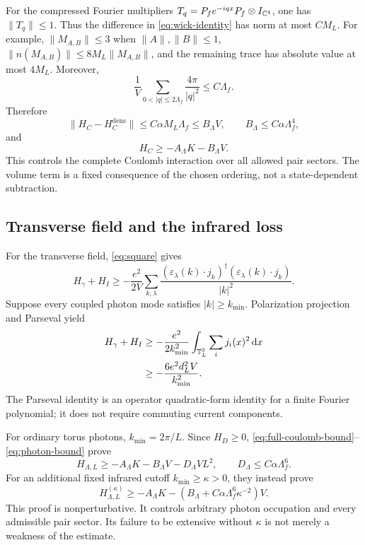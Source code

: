 For the compressed Fourier multipliers
\(T_q=P_fe^{-iqx}P_f\otimes I_{\mathbb C^4}\), one has \(\|T_q\|\le1\).
Thus the difference in \eqref{eq:wick-identity} has norm at most \(CM_L\).
For example, \(\|M_{A,B}\|\le3\) when \(\|A\|,\|B\|\le1\),
\(\|n(M_{A,B})\|\le8M_L\|M_{A,B}\|\), and the remaining trace has
absolute value at most \(4M_L\).
Moreover,
\begin{equation}
\frac1V\sum_{0<|q|\le2\Lambda_f}\frac{4\pi}{|q|^2}
\le C\Lambda_f.
\label{eq:coulomb-mode-sum}
\end{equation}
Therefore
\begin{equation}
\|H_C-H_C^{\mathrm{dens}}\|
\le C\alpha M_L\Lambda_f\le B_\Lambda V,\qquad
B_\Lambda\le C\alpha\Lambda_f^4,
\end{equation}
and
\begin{equation}
H_C\ge-A_\Lambda K-B_\Lambda V.
\label{eq:full-coulomb-bound}
\end{equation}
This controls the complete Coulomb interaction over all allowed pair
sectors. The volume term is a fixed consequence of the chosen ordering,
not a state-dependent subtraction.

\subsection{Transverse field and the infrared loss}
For the transverse field, \eqref{eq:square} gives
\begin{equation}
H_\gamma+H_I\ge
-\frac{e^2}{2V}\sum_{k,\lambda}
\frac{(\varepsilon_\lambda(k)\cdot j_k)^\dagger
(\varepsilon_\lambda(k)\cdot j_k)}{|k|^2}.
\label{eq:photon-current}
\end{equation}
Suppose every coupled photon mode satisfies \(|k|\ge k_{\min}\).
Polarization projection and Parseval yield
\begin{align}
H_\gamma+H_I
&\ge-\frac{e^2}{2k_{\min}^2}
\int_{\mathbb T_L^3}\sum_i j_i(x)^2\,\mathrm d x
\nonumber\\
&\ge-\frac{6e^2d_L^2V}{k_{\min}^2}.
\label{eq:photon-bound}
\end{align}
The Parseval identity is an operator quadratic-form identity for a finite
Fourier polynomial; it does not require commuting current components.

For ordinary torus photons, \(k_{\min}=2\pi/L\). Since \(H_D\ge0\),
\eqref{eq:full-coulomb-bound}--\eqref{eq:photon-bound} prove
\begin{equation}
H_{\Lambda,L}\ge-A_\Lambda K-B_\Lambda V-D_\Lambda VL^2,
\qquad D_\Lambda\le C\alpha\Lambda_f^6.
\label{eq:lower-final}
\end{equation}
For an additional fixed infrared cutoff \(k_{\min}\ge\kappa>0\), they instead
prove
\begin{equation}
H_{\Lambda,L}^{(\kappa)}
\ge-A_\Lambda K-
\left(B_\Lambda+C\alpha\Lambda_f^6\kappa^{-2}\right)V.
\label{eq:ir-final}
\end{equation}
This proof is nonperturbative. It controls arbitrary photon occupation and
every admissible pair sector. Its failure to be extensive without \(\kappa\)
is not merely a weakness of the estimate.

